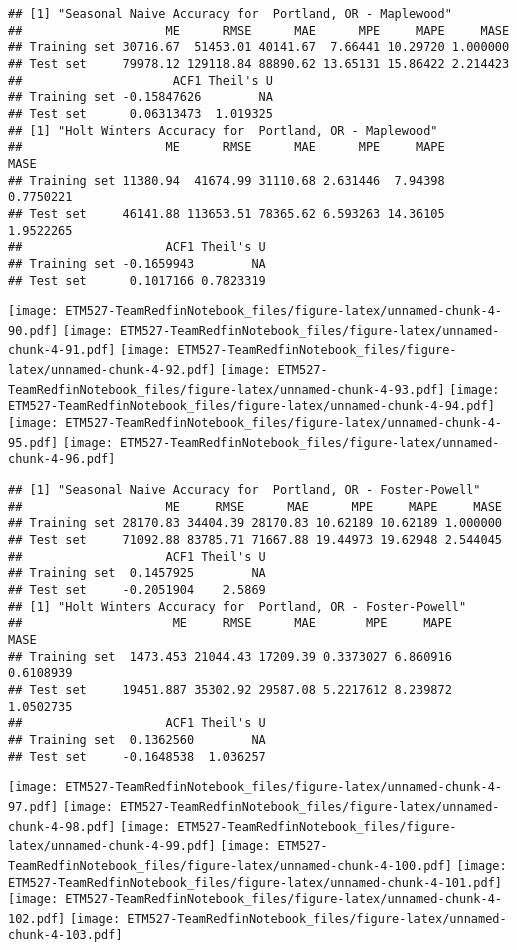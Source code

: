 \documentclass[]{article}
\begin{document}
\begin{verbatim}
## [1] "Seasonal Naive Accuracy for  Portland, OR - Maplewood"
##                    ME      RMSE      MAE      MPE     MAPE     MASE
## Training set 30716.67  51453.01 40141.67  7.66441 10.29720 1.000000
## Test set     79978.12 129118.84 88890.62 13.65131 15.86422 2.214423
##                     ACF1 Theil's U
## Training set -0.15847626        NA
## Test set      0.06313473  1.019325
## [1] "Holt Winters Accuracy for  Portland, OR - Maplewood"
##                    ME      RMSE      MAE      MPE     MAPE      MASE
## Training set 11380.94  41674.99 31110.68 2.631446  7.94398 0.7750221
## Test set     46141.88 113653.51 78365.62 6.593263 14.36105 1.9522265
##                    ACF1 Theil's U
## Training set -0.1659943        NA
## Test set      0.1017166 0.7823319
\end{verbatim}

\texttt{[image: ETM527-TeamRedfinNotebook\_files/figure-latex/unnamed-chunk-4-90.pdf]}
\texttt{[image: ETM527-TeamRedfinNotebook\_files/figure-latex/unnamed-chunk-4-91.pdf]}
\texttt{[image: ETM527-TeamRedfinNotebook\_files/figure-latex/unnamed-chunk-4-92.pdf]}
\texttt{[image: ETM527-TeamRedfinNotebook\_files/figure-latex/unnamed-chunk-4-93.pdf]}
\texttt{[image: ETM527-TeamRedfinNotebook\_files/figure-latex/unnamed-chunk-4-94.pdf]}
\texttt{[image: ETM527-TeamRedfinNotebook\_files/figure-latex/unnamed-chunk-4-95.pdf]}
\texttt{[image: ETM527-TeamRedfinNotebook\_files/figure-latex/unnamed-chunk-4-96.pdf]}

\begin{verbatim}
## [1] "Seasonal Naive Accuracy for  Portland, OR - Foster-Powell"
##                    ME     RMSE      MAE      MPE     MAPE     MASE
## Training set 28170.83 34404.39 28170.83 10.62189 10.62189 1.000000
## Test set     71092.88 83785.71 71667.88 19.44973 19.62948 2.544045
##                    ACF1 Theil's U
## Training set  0.1457925        NA
## Test set     -0.2051904    2.5869
## [1] "Holt Winters Accuracy for  Portland, OR - Foster-Powell"
##                     ME     RMSE      MAE       MPE     MAPE      MASE
## Training set  1473.453 21044.43 17209.39 0.3373027 6.860916 0.6108939
## Test set     19451.887 35302.92 29587.08 5.2217612 8.239872 1.0502735
##                    ACF1 Theil's U
## Training set  0.1362560        NA
## Test set     -0.1648538  1.036257
\end{verbatim}

\texttt{[image: ETM527-TeamRedfinNotebook\_files/figure-latex/unnamed-chunk-4-97.pdf]}
\texttt{[image: ETM527-TeamRedfinNotebook\_files/figure-latex/unnamed-chunk-4-98.pdf]}
\texttt{[image: ETM527-TeamRedfinNotebook\_files/figure-latex/unnamed-chunk-4-99.pdf]}
\texttt{[image: ETM527-TeamRedfinNotebook\_files/figure-latex/unnamed-chunk-4-100.pdf]}
\texttt{[image: ETM527-TeamRedfinNotebook\_files/figure-latex/unnamed-chunk-4-101.pdf]}
\texttt{[image: ETM527-TeamRedfinNotebook\_files/figure-latex/unnamed-chunk-4-102.pdf]}
\texttt{[image: ETM527-TeamRedfinNotebook\_files/figure-latex/unnamed-chunk-4-103.pdf]}
\end{document}
